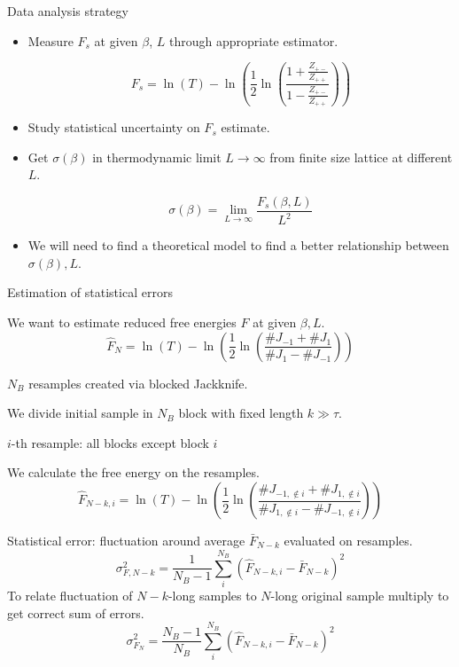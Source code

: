 \documentclass[12pt,handout]{beamer}
\begin{document}
\begin{frame}{Data analysis strategy}
\begin{center}
\begin{itemize}
\item Measure $F_s$ at given $\beta$, $L$ through appropriate estimator.

\[
	F_s = \ln \left( T \right) - \ln \left( \frac{1}{2} \ln \left( \frac{1 + \frac{Z_{+-}}{Z_{++}}}{1 - \frac{Z_{+-}}{Z_{++}}} \right) \right)
\]

\item Study statistical uncertainty on $F_s$ estimate.

\vspace{10pt}
\item Get $\sigma\left(\beta\right)$ in thermodynamic limit $L\rightarrow \infty$ from finite size lattice at different $L$.

\[
	\sigma \left( \beta \right) = \lim_{L \rightarrow \infty} \frac{F_s \left(\beta, L \right)}{L^2}
\]

\item We will need to find a theoretical model to find a better  relationship between $\sigma\left(\beta \right), L$.
\end{itemize}
\vspace{10pt}
\end{center}
\end{frame}

\begin{frame}{Estimation of statistical errors}
\begin{center}
We want to estimate reduced free energies $F$ at given $\beta, L$.
\[
	\hat{F}_N = \ln \left( T \right) - \ln \left( \frac{1}{2} \ln \left( \frac{\# J_{-1} + \# J_1}{\# J_1 - \# J_{-1}} \right) \right)
\]

$N_B$ resamples created via blocked Jackknife.

We divide initial sample in $N_B$ block with fixed length $k\gg \tau$.

$i$-th resample: all blocks except block $i$

We calculate the free energy on the resamples.
\[
	\hat{F}_{N-k, i}  = \ln \left( T \right) - \ln \left( \frac{1}{2} \ln \left( \frac{\# J_{-1, \not\in i} + \# J_{1, \not\in i}}{\# J_{1, \not\in i} - \# J_{-1, \not\in i}} \right) \right)
\]

\end{center}
\end{frame}

\begin{frame}
\begin{center}
Statistical error: fluctuation around average $\bar{F}_{N-k}$ evaluated on resamples.
\[
\sigma_{F, N-k}^2 = \frac{1}{N_B-1}\sum_i ^{N_B} \left(\hat{F}_{N-k, i} - \bar{F}_{N-k}\right)^2
\]
To relate fluctuation of $N-k$-long samples to $N$-long original sample multiply to get correct sum of errors.
\[
\sigma_{F_N}^2 = \frac{N_B-1}{N_B}\sum_i ^{N_B} \left(\hat{F}_{N-k, i} - \bar{F}_{N-k}\right)^2
\]
\end{center}
\end{frame}
\end{document}
